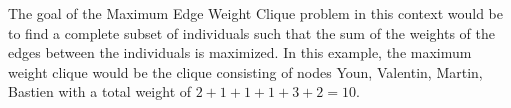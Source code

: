 The goal of the Maximum Edge Weight Clique problem in this context would be to
find a complete subset of individuals such that the sum of the weights of the
edges between the individuals is maximized. 
\newpage
In this example, the maximum weight
clique would be the clique consisting of nodes Youn, Valentin, Martin, Bastien
with a total weight of $2+1+1+1+3+2=10$.